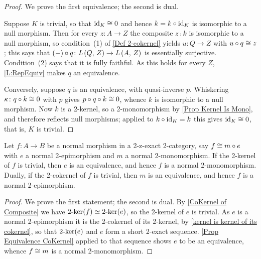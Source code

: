 \begin{proof}
  \leanok
  We prove the first equivalence; the second is dual.

	Suppose \(K\) is trivial, so that \(\operatorname{id}_{K}\cong 0\) and hence \(k=k\circ\operatorname{id}_{K}\) is isomorphic to a null morphism. Then for every \(z\colon A\to Z\) the composite \(z\comp k\) is isomorphic to a null morphism, so condition~(1) of \ref{Def 2-cokernel} yields \(u\colon Q\to Z\) with \(u\circ q\cong z\); this says that \((-)\circ q\colon{\ensuremath{\mathit{L}}}\left({Q},\,{Z}\right)\to{\ensuremath{\mathit{L}}}\left({A},\,{Z}\right)\) is essentially surjective. Condition~(2) says that it is fully faithful. As this holds for every \(Z\), \lemx\ref{L:RepEquiv} makes \(q\) an equivalence.

	Conversely, suppose \(q\) is an equivalence, with quasi-inverse \(p\). Whiskering \(\kappa\colon q\circ k\cong 0\) with \(p\) gives \(p\circ q\circ k\cong 0\), whence \(k\) is isomorphic to a null morphism. Now \(k\) is a 2-kernel, so a 2-monomorphism by \prox\ref{Prop Kernel Is Mono}, and therefore reflects null morphisms; applied to \(k\circ\operatorname{id}_{K}=k\) this gives \(\operatorname{id}_{K}\cong 0\), that is, \(K\) is trivial.
\end{proof}

\begin{corollary}
  \label{Trivial Kernel Normal Mono}   \leanok
  Let \(f\colon A\to B\) be a normal morphism in a 2-z-exact 2-category, say \(f\cong m\circ e\) with \(e\) a normal 2-epimorphism and \(m\) a normal 2-monomorphism. If the 2-kernel of \(f\) is trivial, then \(e\) is an equivalence, and hence \(f\) is a normal 2-monomorphism. Dually, if the 2-cokernel of \(f\) is trivial, then \(m\) is an equivalence, and hence \(f\) is a normal 2-epimorphism.
\end{corollary}

\begin{proof}
  \leanok
  We prove the first statement; the second is dual. By \prox\ref{CoKernel of Composite} we have \(2\text{-}\mathrm{ker}(f)\simeq2\text{-}\mathrm{ker}(e)\), so the 2-kernel of \(e\) is trivial. As \(e\) is a normal 2-epimorphism it is the 2-cokernel of its 2-kernel, by \prox\ref{kernel is kernel of its cokernel}, so that \(2\text{-}\mathrm{ker}(e)\) and \(e\) form a short 2-exact sequence. \prox\ref{Prop Equivalence CoKernel} applied to that sequence shows \(e\) to be an equivalence, whence \(f\cong m\) is a normal 2-monomorphism.
\end{proof}

